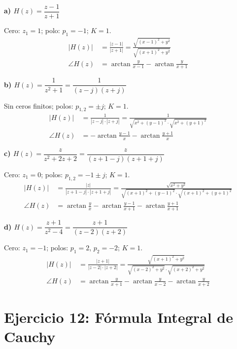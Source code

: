 \documentclass[10pt,a4paper]{article}
\begin{document}
\noindent\textbf{a) $H(z) = \dfrac{z-1}{z+1}$}

Cero: $z_1=1$; polo: $p_1=-1$; $K=1$.
\begin{align*}
	|H(z)| &= \frac{|z-1|}{|z+1|} = \frac{\sqrt{(x-1)^2+y^2}}{\sqrt{(x+1)^2+y^2}} \\[4pt]
	\angle H(z) &= \arctan\!\frac{y}{x-1} - \arctan\!\frac{y}{x+1}
\end{align*}

\bigskip

\noindent\textbf{b) $H(z) = \dfrac{1}{z^2+1} = \dfrac{1}{(z-j)(z+j)}$}

Sin ceros finitos; polos: $p_{1,2}=\pm j$; $K=1$.
\begin{align*}
	|H(z)| &= \frac{1}{|z-j|\cdot|z+j|} = \frac{1}{\sqrt{x^2+(y-1)^2}\cdot\sqrt{x^2+(y+1)^2}} \\[4pt]
	\angle H(z) &= -\arctan\!\frac{y-1}{x} - \arctan\!\frac{y+1}{x}
\end{align*}

\bigskip

\noindent\textbf{c) $H(z) = \dfrac{z}{z^2+2z+2} = \dfrac{z}{(z+1-j)(z+1+j)}$}

Cero: $z_1=0$; polos: $p_{1,2}=-1\pm j$; $K=1$.
\begin{align*}
	|H(z)| &= \frac{|z|}{|z+1-j|\cdot|z+1+j|}
	         = \frac{\sqrt{x^2+y^2}}{\sqrt{(x+1)^2+(y-1)^2}\cdot\sqrt{(x+1)^2+(y+1)^2}} \\[4pt]
	\angle H(z) &= \arctan\!\frac{y}{x}
	               - \arctan\!\frac{y-1}{x+1}
	               - \arctan\!\frac{y+1}{x+1}
\end{align*}

\bigskip

\noindent\textbf{d) $H(z) = \dfrac{z+1}{z^2-4} = \dfrac{z+1}{(z-2)(z+2)}$}

Cero: $z_1=-1$; polos: $p_1=2$, $p_2=-2$; $K=1$.
\begin{align*}
	|H(z)| &= \frac{|z+1|}{|z-2|\cdot|z+2|}
	         = \frac{\sqrt{(x+1)^2+y^2}}{\sqrt{(x-2)^2+y^2}\cdot\sqrt{(x+2)^2+y^2}} \\[4pt]
	\angle H(z) &= \arctan\!\frac{y}{x+1}
	               - \arctan\!\frac{y}{x-2}
	               - \arctan\!\frac{y}{x+2}
\end{align*}
 
\section*{Ejercicio 12: Fórmula Integral de Cauchy}
\end{document}
